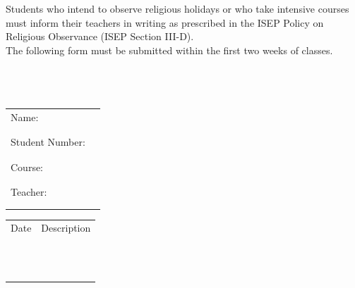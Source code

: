 \documentclass[10pt]{article}
\begin{document}
Students who intend to observe religious holidays or who take intensive courses must inform their teachers in writing as prescribed in the ISEP Policy on Religious Observance (ISEP Section III-D). \\

The following form must be submitted within the first two weeks of classes. \\ \\ \\ \\

\begin{tabular}{@{}p{1.5in}p{5in}}
Name: & \underline{\hspace{5in}} \\ \\ \\
Student Number: & \underline{\hspace{5in}} \\ \\ \\
Course: & \underline{\hspace{5in}} \\ \\ \\
Teacher: & \underline{\hspace{5in}} \\ \\ \\
\end{tabular}

\vspace{0.5in}

\begin{tabular}{@{}p{1.5in}p{5in}}
Date & Description \\ \\ \\
\underline{\hspace{1.5in}}& \underline{\hspace{5in}} \\
\\ \\
\underline{\hspace{1.5in}}& \underline{\hspace{5in}} \\
\\ \\
\underline{\hspace{1.5in}}& \underline{\hspace{5in}} \\
\\ \\
\underline{\hspace{1.5in}}& \underline{\hspace{5in}} \\
\end{tabular}
\vspace{3in}
\vspace*{\fill}
\end{document}
